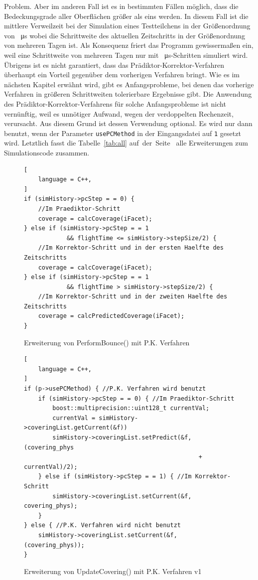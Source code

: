 \documentclass{listhesis}
\begin{document}
Problem. Aber im anderen Fall ist es in bestimmten Fällen möglich, dass die Bedeckungsgrade aller Oberflächen größer als eins werden. In diesem Fall ist die mittlere Verweilzeit bei der Simulation eines Testteilchens in der Größenordnung von \SI{}{\micro\s} wobei die Schrittweite des aktuellen Zeitschritts in der Größenordnung von mehreren Tagen ist. Als Konsequenz friert das Programm gewissermaßen ein, weil eine Schrittweite von mehreren Tagen nur mit \SI{}{\micro\s}-Schritten simuliert wird. Übrigens ist es nicht garantiert, dass das Prädiktor-Korrektor-Verfahren überhaupt ein Vorteil gegenüber dem vorherigen Verfahren bringt. Wie es im nächsten Kapitel erwähnt wird, gibt es Anfangsprobleme, bei denen das vorherige Verfahren in größeren Schrittweiten tolerierbare Ergebnisse gibt. Die Anwendung des Prädiktor-Korrektor-Verfahrens für solche Anfangsprobleme ist nicht vernünftig, weil es unnötiger Aufwand, wegen der verdoppelten Rechenzeit, verursacht. Aus diesem Grund ist dessen Verwendung optional. Es wird nur dann benutzt, wenn der Parameter \texttt{usePCMethod} in der Eingangsdatei auf \texttt{1} gesetzt wird. Letztlich fasst die Tabelle~\ref{tab:all} auf~der~Seite~\pageref{tab:all} alle Erweiterungen zum Simulationscode zusammen.


\begin{figure}[!p]
\centering
\begin{lstlisting}[
    language = C++,
]
if (simHistory->pcStep = = 0) { 
	//Im Praediktor-Schritt
	coverage = calcCoverage(iFacet);
} else if (simHistory->pcStep = = 1 
		    && flightTime <= simHistory->stepSize/2) { 
	//Im Korrektor-Schritt und in der ersten Haelfte des Zeitschritts
	coverage = calcCoverage(iFacet);
} else if (simHistory->pcStep = = 1 
		    && flightTime > simHistory->stepSize/2) {
	//Im Korrektor-Schritt und in der zweiten Haelfte des Zeitschritts
	coverage = calcPredictedCoverage(iFacet);			
}
\end{lstlisting}
\caption{Erweiterung von PerformBounce() mit P.K. Verfahren}
\label{fig:performBounce}
\end{figure}

\begin{figure}[!h]
\centering
\begin{lstlisting}[
    language = C++,
]
if (p->usePCMethod) { //P.K. Verfahren wird benutzt
	if (simHistory->pcStep = = 0) { //Im Praediktor-Schritt
		boost::multiprecision::uint128_t currentVal;
		currentVal = simHistory->coveringList.getCurrent(&f))
		simHistory->coveringList.setPredict(&f, (covering_phys 
												 + currentVal)/2);
	} else if (simHistory->pcStep = = 1) { //Im Korrektor-Schritt	
		simHistory->coveringList.setCurrent(&f, covering_phys);
	}
} else { //P.K. Verfahren wird nicht benutzt
	simHistory->coveringList.setCurrent(&f, (covering_phys));
}
\end{lstlisting}
\caption{Erweiterung von UpdateCovering() mit P.K. Verfahren v1}
\label{fig:updateCov1}
\end{figure}
\end{document}
